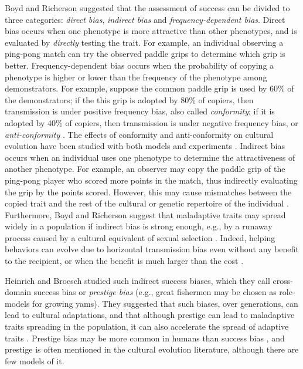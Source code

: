 \documentclass[12pt]{extarticle}
\begin{document}
{Boyd and Richerson} \citep[Ch.~5]{evolutionBook} suggested that the {assessment} of success can be divided to three categories: \emph{direct bias}, \emph{indirect bias} and \emph{frequency-dependent bias}.
{Direct} bias occurs when one phenotype is more attractive than other phenotypes, and is evaluated by \emph{directly} testing the trait.
For example, an individual observing a ping-pong match can {try} the observed paddle grips to determine which grip is better.
Frequency-dependent bias occurs when the probability {of copying} a phenotype is higher or lower than the frequency of the phenotype among demonstrators. 
For example, suppose the common paddle grip is used by 60\% of the demonstrators; if the this grip is adopted by 80\% of copiers, then transmission is under positive frequency bias, also called \emph{conformity}; if it is adopted by 40\% of copiers, then transmission is under negative frequency bias, or \emph{{anti}-conformity} \citep{conformism}. 
The effects of conformity and {anti}-conformity on cultural evolution have been studied with both models \citep{anticonformity,Denton2021,conformity} and experiments \citep{negativeFrequency}.
Indirect bias occurs when an individual uses one phenotype to determine the attractiveness of another phenotype. %
For example, an observer may copy the paddle grip of the {ping}-pong player who scored more points in the match, thus indirectly evaluating the grip by the points scored.
However, this may cause mismatches between the copied trait and the rest of the cultural or genetic repertoire of the individual \citep{Kolodny2022}.
Furthermore, {Boyd and Richerson} \citep[Ch. 8]{evolutionBook} {suggest} that maladaptive traits may spread widely in a population if indirect {bias is} strong enough, e.g., by a runaway process caused by a cultural equivalent of sexual selection \citep{sexualSelectionBook}.
Indeed, helping behaviors can evolve due to horizontal transmission bias even without any benefit to the recipient, or when the benefit is much larger than the cost \citep{cooperation}.

{Heinrich and Broesch \citep{fijian_social_bias}  studied} such indirect success biases, which they call cross-domain success bias or \emph{prestige bias} (e.g., great fishermen may be chosen as role-models for growing yams). They {suggested} that such biases, over generations, can lead to cultural adaptations, and that although prestige can lead to maladaptive traits spreading in the population, it can also accelerate the spread of adaptive traits
\citep[Ch.~8]{evolutionBook}. {Prestige bias may be} more common in humans than success {bias} \citep{complexityPaper}, and prestige is often mentioned in the cultural evolution literature, {although} there are few models of {it}.
\end{document}
